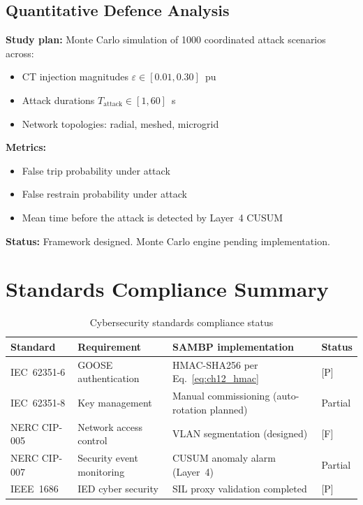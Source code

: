 \subsection{Quantitative Defence Analysis}

\begin{tcolorbox}[colback=orange!5,colframe=orange!60!black,
  fonttitle=\bfseries\small,
  title={Coordinated Attack Quantitative Analysis (Pending)},
  breakable]
\small
\textbf{Study plan:} Monte Carlo simulation of 1000 coordinated attack
scenarios across:
\begin{itemize}
\item CT injection magnitudes $\varepsilon \in [0.01, 0.30]$~pu
\item Attack durations $T_\mathrm{attack} \in [1, 60]$~s
\item Network topologies: radial, meshed, microgrid
\end{itemize}

\textbf{Metrics:}
\begin{itemize}
\item False trip probability under attack
\item False restrain probability under attack
\item Mean time before the attack is detected by Layer~4 CUSUM
\end{itemize}

\textbf{Status:} Framework designed. Monte Carlo engine pending implementation.
\end{tcolorbox}

\section{Standards Compliance Summary}
\label{sec:ch12_standards}

\begin{table}[htbp]
\caption{Cybersecurity standards compliance status}
\label{tab:ch12_standards}
\begin{tabularx}{\textwidth}{@{}lp{5cm}Xl@{}}
\toprule
Standard & Requirement & SAMBP implementation & Status \\
\midrule
IEC~62351-6 & GOOSE authentication & HMAC-SHA256 per Eq.~\eqref{eq:ch12_hmac} & [P] \\
IEC~62351-8 & Key management & Manual commissioning (auto-rotation planned) & Partial \\
NERC CIP-005 & Network access control & VLAN segmentation (designed) & [F] \\
NERC CIP-007 & Security event monitoring & CUSUM anomaly alarm (Layer~4) & Partial \\
IEEE~1686 & IED cyber security & SIL proxy validation completed & [P] \\
\bottomrule
\end{tabularx}
\end{table}

